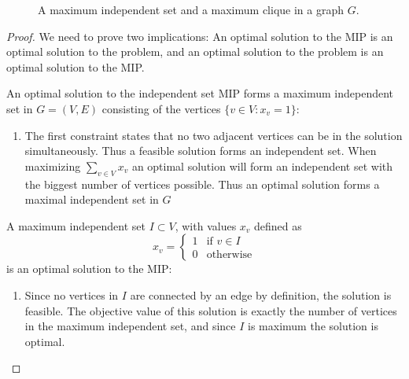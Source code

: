 \begin{example}
\begin{figure}[H]
\caption{A maximum independent set and a maximum clique in a graph $G$.}
\end{figure}
\begin{proof}
We need to prove two implications: An optimal solution to the MIP is an optimal solution to the problem, and an optimal solution to the problem is an optimal solution to the MIP. 

An optimal solution to the independent set MIP forms a maximum independent set in $G=(V,E)$ consisting of the vertices $\{v\in V:x_v=1\}$:
\begin{enumerate}
\item The first constraint states that no two adjacent vertices can be in the solution simultaneously. Thus a feasible solution forms an independent set.
When maximizing $\sum_{v\in V} x_v$ an optimal solution will form an independent set with the biggest number of vertices possible. Thus an optimal solution forms a maximal independent set in $G$
\end{enumerate}
A maximum independent set $I\subset V$, with values $x_v$ defined as $$x_{v} = \left\{
\begin{array}{ll}
1 & \text{if } v \in I \\ 0 & \text{otherwise}
\end{array}\right.$$ is an optimal solution to the MIP:
\begin{enumerate}
\item Since no vertices in $I$ are connected by an edge by definition, the solution is feasible. The objective value of this solution is exactly the number of vertices in the maximum independent set, and since $I$ is maximum the solution is optimal.
\end{enumerate}


\end{proof}
\end{example}
